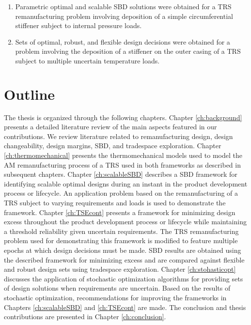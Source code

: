 \begin{enumerate}
	\item{Parametric optimal and scalable \ac{SBD} solutions were obtained for a \ac{TRS} remanufacturing problem involving deposition of a simple circumferential stiffener subject to internal pressure loads.}
	\item{Sets of optimal, robust, and flexible design decisions were obtained for a problem involving the deposition of a stiffener on the outer casing of a \ac{TRS} subject to multiple uncertain temperature loads.}
\end{enumerate}

\section{Outline}
\label{sec:outline}

The thesis is organized through the following chapters. Chapter \ref{ch:background} presents a detailed literature review of the main aspects featured in our contributions. We review literature related to remanufacturing design, design changeability, design margins, \ac{SBD}, and tradespace exploration. Chapter \ref{ch:thermomechanical} presents the thermomechanical models used to model the \ac{AM} remanufacturing process of a \ac{TRS} used in both frameworks as described in subsequent chapters. Chapter \ref{ch:scalableSBD} describes a \ac{SBD} framework for identifying scalable optimal designs during an instant in the product development process or lifecycle. An application problem based on the remanufacturing of a \ac{TRS} subject to varying requirements and loads is used to demonstrate the framework. Chapter \ref{ch:TSEcont} presents a framework for minimizing design excess throughout the product development process or lifecycle while maintaining a threshold reliability given uncertain requirements. The \ac{TRS} remanufacturing problem used for demonstrating this framework is modified to feature multiple epochs at which design decisions must be made. \ac{SBD} results are obtained using the described framework for minimizing excess and are compared against flexible and robust design sets using tradespace exploration. Chapter \ref{ch:stohasticopt} discusses the application of stochastic optimization algorithms for providing sets of design solutions when requirements are uncertain. Based on the results of stochastic optimization, recommendations for improving the frameworks in Chapters \ref{ch:scalableSBD} and \ref{ch:TSEcont} are made. The conclusion and thesis contributions are presented in Chapter \ref{ch:conclusion}.